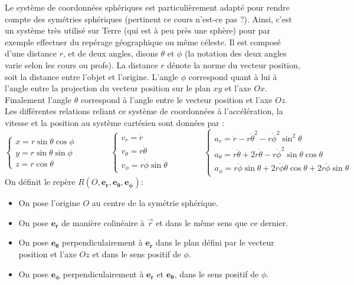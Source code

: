 \documentclass{article}
\begin{document}
Le système de coordonnées sphériques est particulièrement adapté pour rendre compte des symétries sphériques (pertinent ce cours n'est-ce pas ?). Ainsi, c'est un système très utilisé sur Terre (qui est à peu près une sphère) pour par exemple effectuer du repérage géographique ou même céleste. Il est composé d'une distance $r$, et de deux angles, disons $\theta$ et $\phi$ (la notation des deux angles varie selon les cours ou profs).
La distance $r$ dénote la norme du vecteur position, soit la distance entre l'objet et l'origine. L'angle $\phi$ correspond quant à lui à l'angle entre la projection du vecteur position sur le plan $xy$ et l'axe $Ox$. Finalement l'angle $\theta$ correspond à l'angle entre le vecteur position et l'axe $Oz$. Les différentes relations reliant ce système de coordonnées à l'accélération, la vitesse et la position au système cartésien sont données par :
\begin{equation*}  
\begin{cases} x = r \sin{\theta}\cos{\phi}\\
y = r \sin{\theta}\sin{\phi}\\
z = r\cos{\theta}
\end{cases} \qquad  \qquad   
\begin{cases} v_r = \dot r \\
v_\theta = r\dot \theta \\
v_\phi = r\dot \phi \sin{\theta} 
\end{cases} \qquad  \qquad 
\begin{cases} a_r = \ddot{r} - r \dot \theta^2 - r\dot\phi^2\sin^2{\theta}\\
a_\theta = r\ddot \theta + 2\dot r \dot \theta - r\dot \phi^2\sin{\theta}\cos{\theta}\\
a_\phi = r\ddot \phi \sin{\theta} + 2r\dot \phi \dot \theta \cos{\theta} + 2r\dot \phi  \sin{\theta} 
\end{cases} 
\end{equation*}
On définit le repère $R(O,\mathbf{e_r},\mathbf{e_\theta}, \mathbf{e_\phi}) $: 
\begin{itemize}
    \item On pose l'origine $O$ au centre de la symétrie sphérique.
    \item On pose $\mathbf{e_r}$ de manière colinéaire à $\vec{r}$ et dans le même sens que ce dernier.
    \item On pose $\mathbf{e_\theta}$ perpendiculairement à $\mathbf{e_r}$ dans le plan défini par le vecteur position et l'axe $Oz$ et dans le sens positif de $\phi$. 
    \item On pose $\mathbf{e_\phi}$ perpendiculairement à $\mathbf{e_r}$ et $\mathbf{e_\theta}$, dans le sens positif de $\phi$. 
\end{itemize}
\end{document}

